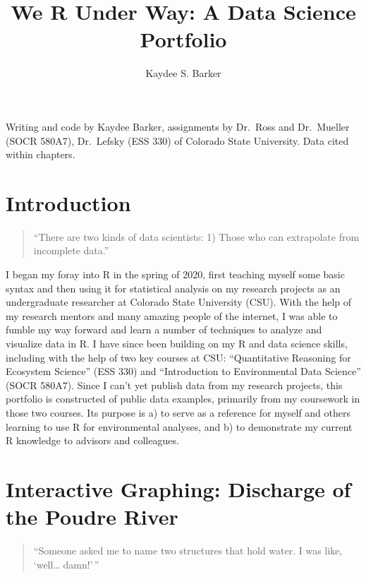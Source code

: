 \documentclass[
]{book}
\title{We R Under Way: A Data Science Portfolio}
\author{Kaydee S. Barker}
\date{}
\begin{document}
\maketitle

{
\setcounter{tocdepth}{1}
\tableofcontents
}
Writing and code by Kaydee Barker, assignments by Dr.~Ross and Dr.~Mueller (SOCR 580A7), Dr.~Lefsky (ESS 330) of Colorado State University. Data cited within chapters.

\hypertarget{intro}{%
\chapter{Introduction}\label{intro}}

\begin{quote}
``There are two kinds of data scientists: 1) Those who can extrapolate from incomplete data.''
\end{quote}

I began my foray into R in the spring of 2020, first teaching myself some basic syntax and then using it for statistical analysis on my research projects as an undergraduate researcher at Colorado State University (CSU). With the help of my research mentors and many amazing people of the internet, I was able to fumble my way forward and learn a number of techniques to analyze and visualize data in R. I have since been building on my R and data science skills, including with the help of two key courses at CSU: ``Quantitative Reasoning for Ecosystem Science'' (ESS 330) and ``Introduction to Environmental Data Science'' (SOCR 580A7). Since I can't yet publish data from my research projects, this portfolio is constructed of public data examples, primarily from my coursework in those two courses. Its purpose is a) to serve as a reference for myself and others learning to use R for environmental analyses, and b) to demonstrate my current R knowledge to advisors and colleagues.

\hypertarget{interactive-graphing-discharge-of-the-poudre-river}{%
\chapter{Interactive Graphing: Discharge of the Poudre River}\label{interactive-graphing-discharge-of-the-poudre-river}}

\begin{quote}
``Someone asked me to name two structures that hold water. I was like, `well\ldots{} damn!'\,''
\end{quote}
\end{document}

